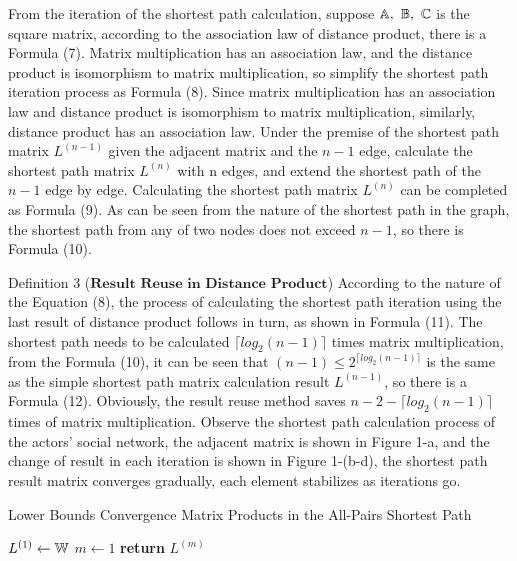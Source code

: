 \documentclass[10pt,twocolumn,letterpaper]{article}
\begin{document}
From the iteration of the shortest path calculation, suppose \(\Bbb A,\ \Bbb B,\ \Bbb C\) is the square matrix, according to the association law of distance product, there is a Formula (7).
Matrix multiplication has an association law, and the distance product is isomorphism to matrix multiplication, so simplify the shortest path iteration process as Formula (8).
Since matrix multiplication has an association law and distance product is isomorphism to matrix multiplication, similarly, distance product has an association law.
Under the premise of the shortest path matrix $L^{(n-1)}$ given the adjacent matrix and the $n-1$ edge, calculate the shortest path matrix $L^{(n)}$ with n edges, and extend the shortest path of the $n-1$ edge by edge.
Calculating the shortest path matrix $L^{(n)}$ can be completed as Formula (9).
As can be seen from the nature of the shortest path in the graph, the shortest path from any of two nodes does not exceed $n-1$, so there is Formula (10).

Definition 3 ($\textbf{Result Reuse in Distance Product}$) According to the nature of the Equation (8), the process of calculating the shortest path iteration using the last result of distance product follows in turn, as shown in Formula (11).
The shortest path needs to be calculated $\lceil{log_2(n-1)}\rceil$ times matrix multiplication, from the Formula (10), it can be seen that $(n-1)\leq2^{\lceil{log_2(n-1)}\rceil}$ is the same as the simple shortest path matrix calculation result $L^{(n-1)}$, so there is a Formula (12).
Obviously, the result reuse method saves $n-2-\lceil{log_2(n-1)}\rceil$ times of matrix multiplication.
Observe the shortest path calculation process of the actors' social network, the adjacent matrix is shown in Figure 1-a, and the change of result in each iteration is shown in Figure 1-(b-d), the shortest path result matrix converges gradually, each element stabilizes as iterations go.


\begin{algorithm}
\caption{Lower Bounds Convergence Matrix Products in the All-Pairs Shortest Path}\label{algorithm}
  $L^{(1)}\leftarrow \Bbb W$\;
  $m\leftarrow 1$\;
  {\bf return} $L^{(m)}$\;
\end{algorithm}
\end{document}
